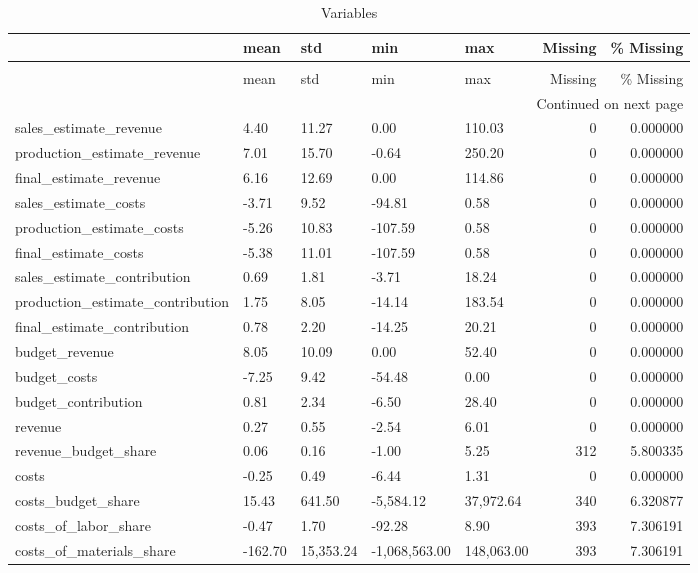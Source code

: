 \begin{longtable}{lllllrr}
\caption{Variables} \label{eda_1} \\
\toprule
 & mean & std & min & max & Missing & \% Missing \\
\midrule
\endfirsthead
\caption[]{Variables} \\
\toprule
 & mean & std & min & max & Missing & \% Missing \\
\midrule
\endhead
\midrule
\multicolumn{7}{r}{Continued on next page} \\
\midrule
\endfoot
\bottomrule
\endlastfoot
sales_estimate_revenue & 4.40 & 11.27 & 0.00 & 110.03 & 0 & 0.000000 \\
production_estimate_revenue & 7.01 & 15.70 & -0.64 & 250.20 & 0 & 0.000000 \\
final_estimate_revenue & 6.16 & 12.69 & 0.00 & 114.86 & 0 & 0.000000 \\
sales_estimate_costs & -3.71 & 9.52 & -94.81 & 0.58 & 0 & 0.000000 \\
production_estimate_costs & -5.26 & 10.83 & -107.59 & 0.58 & 0 & 0.000000 \\
final_estimate_costs & -5.38 & 11.01 & -107.59 & 0.58 & 0 & 0.000000 \\
sales_estimate_contribution & 0.69 & 1.81 & -3.71 & 18.24 & 0 & 0.000000 \\
production_estimate_contribution & 1.75 & 8.05 & -14.14 & 183.54 & 0 & 0.000000 \\
final_estimate_contribution & 0.78 & 2.20 & -14.25 & 20.21 & 0 & 0.000000 \\
budget_revenue & 8.05 & 10.09 & 0.00 & 52.40 & 0 & 0.000000 \\
budget_costs & -7.25 & 9.42 & -54.48 & 0.00 & 0 & 0.000000 \\
budget_contribution & 0.81 & 2.34 & -6.50 & 28.40 & 0 & 0.000000 \\
revenue & 0.27 & 0.55 & -2.54 & 6.01 & 0 & 0.000000 \\
revenue_budget_share & 0.06 & 0.16 & -1.00 & 5.25 & 312 & 5.800335 \\
costs & -0.25 & 0.49 & -6.44 & 1.31 & 0 & 0.000000 \\
costs_budget_share & 15.43 & 641.50 & -5,584.12 & 37,972.64 & 340 & 6.320877 \\
costs_of_labor_share & -0.47 & 1.70 & -92.28 & 8.90 & 393 & 7.306191 \\
costs_of_materials_share & -162.70 & 15,353.24 & -1,068,563.00 & 148,063.00 & 393 & 7.306191 \\

\end{longtable}
